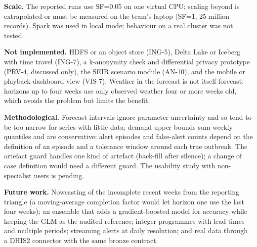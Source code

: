 \documentclass[conference]{IEEEtran}
\begin{document}
\textbf{Scale.} The reported runs use SF=0.05 on one virtual CPU; scaling beyond is extrapolated or must be measured on the team's laptop (SF=1, 25 million records). Spark was used in local mode; behaviour on a real cluster was not tested.

\textbf{Not implemented.} HDFS or an object store (ING-5), Delta Lake or Iceberg with time travel (ING-7), a k-anonymity check and differential privacy prototype (PRV-4, discussed only), the SEIR scenario module (AN-10), and the mobile or playback dashboard view (VIS-7). Weather in the forecast is not itself forecast: horizons up to four weeks use only observed weather four or more weeks old, which avoids the problem but limits the benefit.

\textbf{Methodological.} Forecast intervals ignore parameter uncertainty and so tend to be too narrow for series with little data; demand upper bounds sum weekly quantiles and are conservative; alert episodes and false-alert counts depend on the definition of an episode and a tolerance window around each true outbreak. The artefact guard handles one kind of artefact (back-fill after silence); a change of case definition would need a different guard. The usability study with non-specialist users is pending.

\textbf{Future work.} Nowcasting of the incomplete recent weeks from the reporting triangle (a moving-average completion factor would let horizon one use the last four weeks); an ensemble that adds a gradient-boosted model for accuracy while keeping the GLM as the audited reference; integer programmes with lead times and multiple periods; streaming alerts at daily resolution; and real data through a DHIS2 connector with the same bronze contract.
\end{document}
